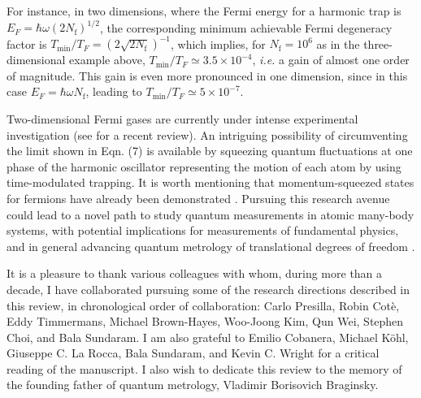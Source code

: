\documentclass[pra,letterpaper,twocolumn,showpacs,superscriptaddress]{revtex4}
\begin{document}
For instance, in two dimensions, where the Fermi energy for a harmonic trap is $E_F= \hbar \omega (2N_\mathrm{f})^{1/2}$, the corresponding minimum 
achievable Fermi degeneracy factor is $T_{\mathrm{min}}/T_F=(2 \sqrt{2 N_\mathrm{f}})^{-1}$, which implies, for $N_\mathrm{f} = 10^6$ as in the three-dimensional 
example above, $T_{\mathrm{min}}/T_F \simeq 3.5 \times 10^{-4}$, {\it i.e.} a gain of almost one order of magnitude. This gain is even more 
pronounced in one dimension, since in this case $E_F= \hbar \omega N_\mathrm{f}$, leading to $T_{\mathrm{min}}/T_F \simeq 5 \times 10^{-7}$. 

Two-dimensional Fermi gases are currently under intense experimental investigation (see \cite{Barmashova2016} for a recent review).
An intriguing possibility of circumventing the limit shown in Eqn. (7) is available by squeezing quantum fluctuations at one phase of the 
harmonic oscillator representing the motion of each atom by using time-modulated trapping. It is worth mentioning that momentum-squeezed 
states for fermions have already been demonstrated \cite{Wang2011}. Pursuing this research avenue could lead to a novel path to study quantum 
measurements in atomic many-body systems, with potential implications for measurements of fundamental physics, and in general advancing quantum 
metrology of translational degrees of freedom \cite{Braginsky1967,Braginsky1974,Braginsky1996}.

\begin{acknowledgments}
It is a pleasure to thank various colleagues with whom, during more than a decade, I have collaborated pursuing some of the research directions 
described in this review, in chronological order of collaboration: Carlo Presilla, Robin Cot\`e, Eddy Timmermans, Michael Brown-Hayes, Woo-Joong Kim, 
Qun Wei, Stephen Choi, and Bala Sundaram. I am also grateful to Emilio Cobanera, Michael K\"ohl, Giuseppe C. La Rocca, Bala Sundaram, and Kevin C. Wright for a critical 
reading of the manuscript.  I also wish to dedicate this review to the memory of the founding father of quantum metrology, Vladimir Borisovich Braginsky.

\end{acknowledgments}
\end{document}
